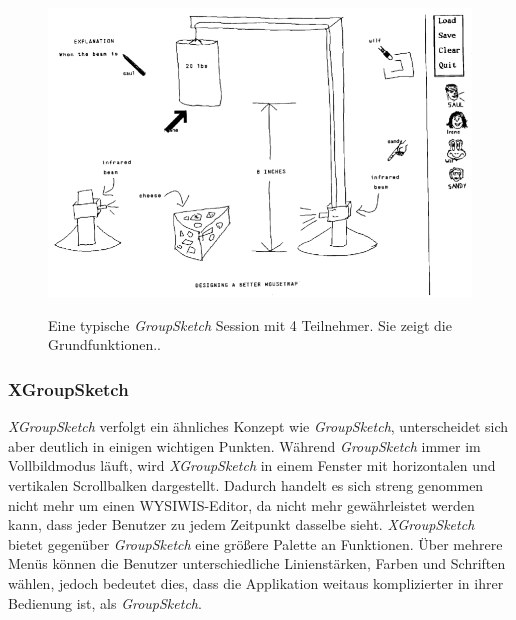 \begin{figure}
        {\includegraphics[width=1\linewidth]{gfx/greenbergGroupSketch}}
		\caption[GroupSketch \newline \citep{Greenberg:1992p83}]{Eine typische \emph{GroupSketch} Session mit 4 Teilnehmer. Sie zeigt die Grundfunktionen..}\label{fig:greenbergGroupSketch}
\end{figure}

\subsubsection{XGroupSketch} 
\emph{XGroupSketch} verfolgt ein ähnliches Konzept wie \emph{GroupSketch}, unterscheidet sich aber deutlich in einigen wichtigen Punkten. Während \emph{GroupSketch} immer im Vollbildmodus läuft, wird \emph{XGroupSketch} in einem Fenster mit horizontalen und vertikalen Scrollbalken dargestellt. Dadurch handelt es sich streng genommen nicht mehr um einen WYSIWIS-Editor, da nicht mehr gewährleistet werden kann, dass jeder Benutzer zu jedem Zeitpunkt dasselbe sieht. \emph{XGroupSketch} bietet gegenüber \emph{GroupSketch} eine größere Palette an Funktionen. Über mehrere Menüs können die Benutzer unterschiedliche Linienstärken, Farben und Schriften wählen, jedoch bedeutet dies, dass die Applikation weitaus komplizierter in ihrer Bedienung ist, als \emph{GroupSketch}.

